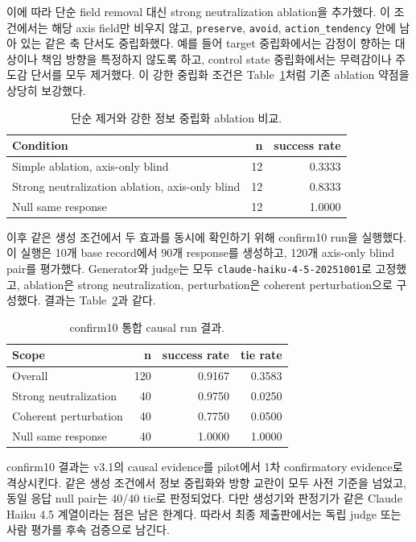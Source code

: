 \documentclass[11pt,a4paper]{article}
\begin{document}
이에 따라 단순 field removal 대신 strong neutralization ablation을 추가했다. 이 조건에서는 해당 axis field만 비우지 않고, \texttt{preserve}, \texttt{avoid}, \texttt{action\_tendency} 안에 남아 있는 같은 축 단서도 중립화했다. 예를 들어 target 중립화에서는 감정이 향하는 대상이나 책임 방향을 특정하지 않도록 하고, control state 중립화에서는 무력감이나 주도감 단서를 모두 제거했다. 이 강한 중립화 조건은 Table~\ref{tab:neutralized-ablation}처럼 기존 ablation 약점을 상당히 보강했다.

\begin{table}[h]
\centering
\small
\begin{tabular}{lrr}
\toprule
Condition & n & success rate \\
\midrule
Simple ablation, axis-only blind & 12 & 0.3333 \\
Strong neutralization ablation, axis-only blind & 12 & 0.8333 \\
Null same response & 12 & 1.0000 \\
\bottomrule
\end{tabular}
\caption{단순 제거와 강한 정보 중립화 ablation 비교.}
\label{tab:neutralized-ablation}
\end{table}

이후 같은 생성 조건에서 두 효과를 동시에 확인하기 위해 confirm10 run을 실행했다. 이 실행은 10개 base record에서 90개 response를 생성하고, 120개 axis-only blind pair를 평가했다. Generator와 judge는 모두 \texttt{claude-haiku-4-5-20251001}로 고정했고, ablation은 strong neutralization, perturbation은 coherent perturbation으로 구성했다. 결과는 Table~\ref{tab:confirm10-causal}과 같다.

\begin{table}[h]
\centering
\small
\begin{tabular}{lrrr}
\toprule
Scope & n & success rate & tie rate \\
\midrule
Overall & 120 & 0.9167 & 0.3583 \\
Strong neutralization & 40 & 0.9750 & 0.0250 \\
Coherent perturbation & 40 & 0.7750 & 0.0500 \\
Null same response & 40 & 1.0000 & 1.0000 \\
\bottomrule
\end{tabular}
\caption{confirm10 통합 causal run 결과.}
\label{tab:confirm10-causal}
\end{table}

confirm10 결과는 v3.1의 causal evidence를 pilot에서 1차 confirmatory evidence로 격상시킨다. 같은 생성 조건에서 정보 중립화와 방향 교란이 모두 사전 기준을 넘었고, 동일 응답 null pair는 40/40 tie로 판정되었다. 다만 생성기와 판정기가 같은 Claude Haiku 4.5 계열이라는 점은 남은 한계다. 따라서 최종 제출판에서는 독립 judge 또는 사람 평가를 후속 검증으로 남긴다.
\end{document}
